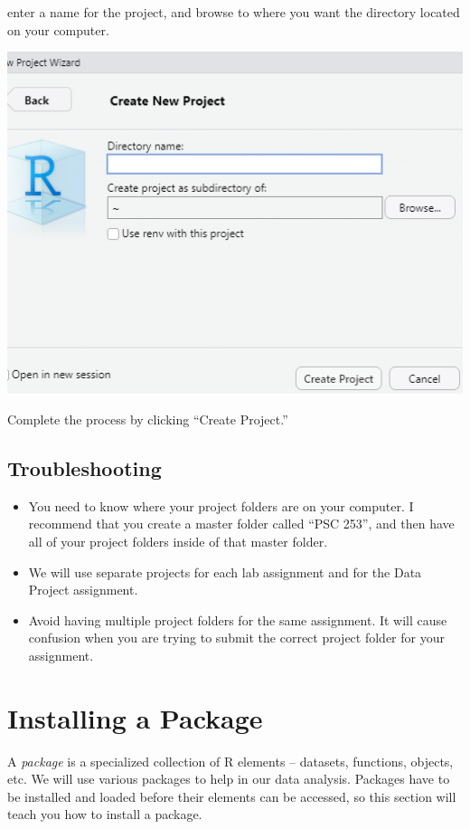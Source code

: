 \documentclass[
]{book}
\providecommand{\tightlist}{%
  \setlength{\itemsep}{0pt}\setlength{\parskip}{0pt}}
\begin{document}
enter a name for the project, and browse to where you want the directory located on your computer.

\includegraphics[width=6.96in]{images/projdirectory}

Complete the process by clicking ``Create Project.''

\hypertarget{troubleshooting-3}{%
\subsection{Troubleshooting}\label{troubleshooting-3}}

\begin{itemize}
\tightlist
\item
  You need to know where your project folders are on your computer. I recommend that you create a master folder called ``PSC 253'', and then have all of your project folders inside of that master folder.
\item
  We will use separate projects for each lab assignment and for the Data Project assignment.
\item
  Avoid having multiple project folders for the same assignment. It will cause confusion when you are trying to submit the correct project folder for your assignment.
\end{itemize}

\hypertarget{installpack}{%
\section{Installing a Package}\label{installpack}}

A \emph{package} is a specialized collection of R elements -- datasets, functions, objects, etc. We will use various packages to help in our data analysis. Packages have to be installed and loaded before their elements can be accessed, so this section will teach you how to install a package.
\end{document}
